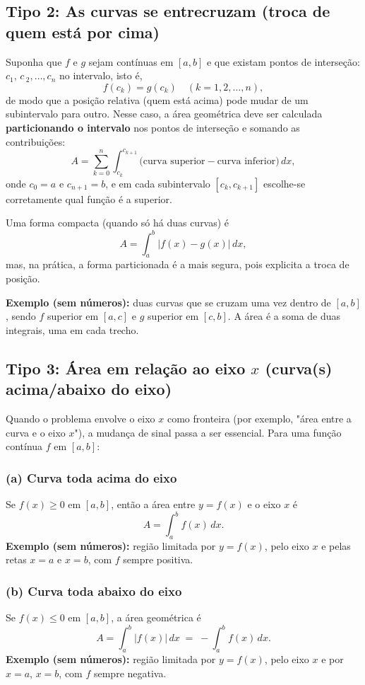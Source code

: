 \subsection{Tipo 2: As curvas se entrecruzam (troca de quem está por cima)}
Suponha que \(f\) e \(g\) sejam contínuas em \([a,b]\) e que existam pontos de interseção:\\
 \(c_1,\, c\,_2, \dots,c_n\) no intervalo, isto é,
\[
f(c_k)=g(c_k)\quad (k=1,2,\dots,n),
\]
de modo que a posição relativa (quem está acima) pode mudar de um subintervalo para outro. Nesse caso, a área geométrica deve ser calculada \textbf{particionando o intervalo} nos pontos de interseção e somando as contribuições:
\[
A=\sum_{k=0}^{n}\int_{c_k}^{c_{k+1}} \big(\text{curva superior} - \text{curva inferior}\big)\,dx,
\]
onde \(c_0=a\) e \(c_{n+1}=b\), e em cada subintervalo \([c_k,c_{k+1}]\) escolhe-se corretamente qual função é a superior.

Uma forma compacta (quando só há duas curvas) é
\[
A=\int_a^b \big|f(x)-g(x)\big|\,dx,
\]
mas, na prática, a forma particionada é a mais segura, pois explicita a troca de posição.

\textbf{Exemplo (sem números):} duas curvas que se cruzam uma vez dentro de \([a,b]\), sendo \(f\) superior em \([a,c]\) e \(g\) superior em \([c,b]\). A área é a soma de duas integrais, uma em cada trecho.

\subsection{Tipo 3: Área em relação ao eixo \texorpdfstring{\(x\)}{x} (curva(s) acima/abaixo do eixo)}

Quando o problema envolve o eixo \(x\) como fronteira (por exemplo, "área entre a curva e o eixo \(x\)"), a mudança de sinal passa a ser essencial. Para uma função contínua \(f\) em \([a,b]\):

\subsubsection*{(a) Curva toda acima do eixo}
Se \(f(x)\ge 0\) em \([a,b]\), então a área entre \(y=f(x)\) e o eixo \(x\) é
\[
A=\int_a^b f(x)\,dx.
\]
\textbf{Exemplo (sem números):} região limitada por \(y=f(x)\), pelo eixo \(x\) e pelas retas \(x=a\) e \(x=b\), com \(f\) sempre positiva.

\subsubsection*{(b) Curva toda abaixo do eixo}
Se \(f(x)\le 0\) em \([a,b]\), a área geométrica é
\[
A=\int_a^b |f(x)|\,dx \;=\; -\int_a^b f(x)\,dx.
\]
\textbf{Exemplo (sem números):} região limitada por \(y=f(x)\), pelo eixo \(x\) e por \(x=a\), \(x=b\), com \(f\) sempre negativa.


